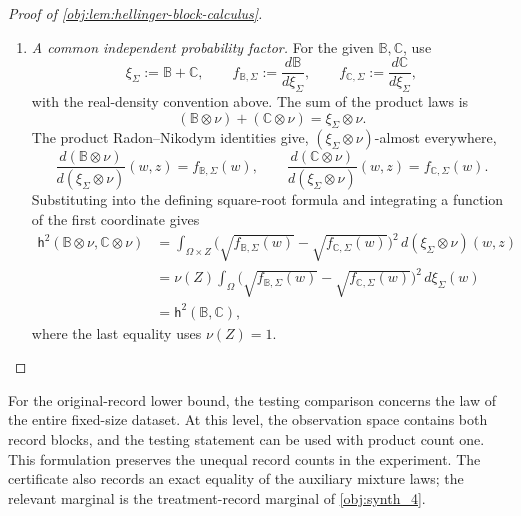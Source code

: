 \documentclass[11pt]{article}
\begin{document}
\begin{proof}[Proof of \cref{obj:lem:hellinger-block-calculus}]
\begin{enumerate}
\item \emph{A common independent probability factor.}
For the given \(\mathbb B,\mathbb C\), use
\[
\xi_{\Sigma}:=\mathbb B+\mathbb C,
\qquad
f_{\mathbb B,\Sigma}:=\frac{d\mathbb B}{d\xi_{\Sigma}},
\qquad
f_{\mathbb C,\Sigma}:=\frac{d\mathbb C}{d\xi_{\Sigma}},
\]
with the real-density convention above. The sum of the product laws is
\[
(\mathbb B\otimes\nu)+(\mathbb C\otimes\nu)
=\xi_{\Sigma}\otimes\nu.
\]
The product Radon--Nikodym identities give, \((\xi_{\Sigma}\otimes\nu)\)-almost everywhere,
\[
\frac{d(\mathbb B\otimes\nu)}{d(\xi_{\Sigma}\otimes\nu)}(w,z)
=f_{\mathbb B,\Sigma}(w),
\qquad
\frac{d(\mathbb C\otimes\nu)}{d(\xi_{\Sigma}\otimes\nu)}(w,z)
=f_{\mathbb C,\Sigma}(w).
\]
Substituting into the defining square-root formula and integrating a function of the first coordinate gives
\[
\begin{aligned}
\mathsf h^2(\mathbb B\otimes\nu,\mathbb C\otimes\nu)
&=
\int_{\Omega\times Z}
\bigl(\sqrt{f_{\mathbb B,\Sigma}(w)}
      -\sqrt{f_{\mathbb C,\Sigma}(w)}\bigr)^2
\,d(\xi_{\Sigma}\otimes\nu)(w,z)\\
&=
\nu(Z)
\int_\Omega
\bigl(\sqrt{f_{\mathbb B,\Sigma}(w)}
      -\sqrt{f_{\mathbb C,\Sigma}(w)}\bigr)^2
\,d\xi_{\Sigma}(w)\\
&=\mathsf h^2(\mathbb B,\mathbb C),
\end{aligned}
\]
where the last equality uses \(\nu(Z)=1\).
\end{enumerate}
\end{proof}

For the original-record lower bound, the testing comparison concerns the law of the entire fixed-size dataset. At this level, the observation space contains both record blocks, and the testing statement can be used with product count one. This formulation preserves the unequal record counts in the experiment. The certificate also records an exact equality of the auxiliary mixture laws; the relevant marginal is the treatment-record marginal of \cref{obj:synth_4}.
\end{document}
